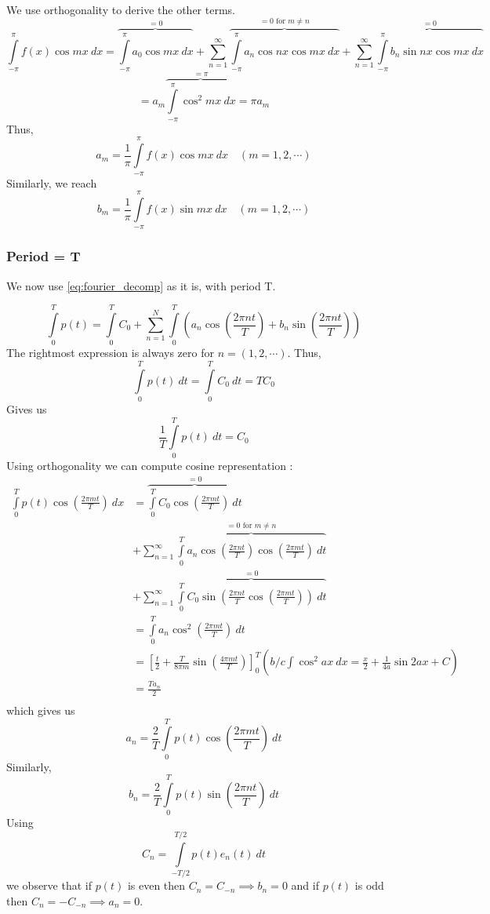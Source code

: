 We use orthogonality to derive the other terms. 
\[
    \int\limits_{-\pi}^{\pi} f(x) \cos mx \ dx =  \overbrace{ \int\limits_{-\pi}^{\pi} a_0
    \cos mx \ dx }^{= 0} + \sum_{n=1}^{\infty} \overbrace{ \int\limits_{-\pi}^{\pi} a_n
\cos nx \cos mx \ dx }^{= 0 \text{ for } m \neq n} + \sum_{n=1}^{\infty} 
\overbrace{ \int\limits_{-\pi}^{\pi} b_n\sin nx \cos mx \ dx  }^{=0}
\]
\[
    = a_m  \overbrace{\int\limits_{-\pi}^{\pi} \cos^2 mx \ dx  }^{=\pi} = \pi a_m
\]
Thus, 
\[
a_m = \frac{ 1 }{ \pi } \int\limits_{-\pi}^{\pi} f(x) \cos mx \ dx \quad \left( m = 1, 2,
\cdots \right) 
\]
Similarly, we reach 
\[
b_m = \frac{ 1 }{ \pi } \int\limits_{-\pi}^{\pi} f(x) \sin mx \ dx \quad \left( m = 1, 2,
\cdots \right) 
\]
\subsubsection{Period = T}
We now use \ref{eq:fourier_decomp} as it is, with period T. 

\[
    \int\limits_{0}^{T}    p(t)  = \int\limits_{0}^{T}  C_0 + \sum_{n=1}^{N}
     \int\limits_{0}^{T} \left( a_n\cos\left( \frac{ 2\pi nt }{ T } \right) +
        b_n\sin\left( \frac{ 2\pi nt }{ T } \right) \right)  
\]
The rightmost expression is always zero for $ n = (1, 2, \cdots) $. Thus, 
\[
\int\limits_{0}^{T} p(t) \ dt = \int\limits_{0}^{T} C_0 \ dt = TC_0
\]
Gives us 
\[
   \frac{ 1 }{ T }   \int\limits_{0}^{T} p(t) \ dt = C_0
\]
Using orthogonality we can compute cosine representation : 
\begin{align*}    
    \int\limits_{0}^{T} p(t) \cos\left( \frac{2\pi mt  }{ T } \right) \ dx &=
    \overbrace{\int\limits_{0}^{T} C_0 \cos\left(\frac{ 2\pi mt }{ T }  \right) \
    dt}^{=0}\\ 
     &+\sum_{n=1}^{\infty}   \overbrace{\int\limits_{0}^{T} a_n \cos\left(\frac{ 2\pi nt }{ T }  \right)
     \cos\left( \frac{ 2\pi mt }{ T } \right)  \ dt}^{=0 \text{ for } m\neq n}  
  \\ &+ \sum_{n=1}^{\infty}  \overbrace{\int\limits_{0}^{T} C_0 \sin\left(\frac{ 2\pi nt }{ T
     }\cos\left( \frac{ 2\pi mt }{ T } \right)   \right) \ dt}^{=0}\\
     &= \int\limits_{0}^{T} a_n\cos^2\left( \frac{ 2\pi mt }{ T } \right) \ dt \\ 
     &= \left[ \frac{ t }{ 2 } + \frac{ T }{ 8\pi m } \sin\left( \frac{ 4\pi m t }{ T }
     \right) \right] ^T_0 \left( b/c \int\limits_{ }^{ } \cos^2 ax \ dx = \frac{ x }{ 2 }
 + \frac{ 1 }{ 4a } \sin 2ax + C\right) \\ 
     &= \frac{ Ta_n }{ 2 }  \\ 
\end{align*}
which gives us 
\[
a_n = \frac{ 2 }{ T } \int\limits_{0}^{T} p(t) \cos\left( \frac{2\pi mt  }{ T } \right) \
dt 
\]
Similarly, 
\[
    b_n = \frac{ 2 }{ T } \int\limits_{0}^{T} p(t) \sin\left( \frac{ 2\pi nt }{ T }
    \right) \ dt
\]
Using 
\[
    C_n = \int\limits_{-T/2}^{T/2} p(t) e_n(t) \ dt 
\]
we observe that if $ p(t) $ is even then $ C_n = C_{-n} \implies b_n = 0 $ and if $ p(t) $
is odd then $ C_n = - C_{-n} \implies a_n = 0 $. 

